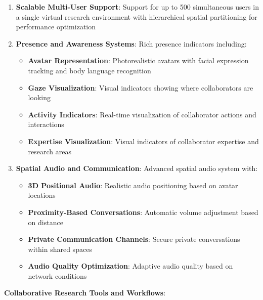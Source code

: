 \documentclass[10pt,twocolumn]{article}
\begin{document}
\begin{enumerate}
    \item \textbf{Scalable Multi-User Support}: Support for up to 500 simultaneous users in a single virtual research environment with hierarchical spatial partitioning for performance optimization
    
    \item \textbf{Presence and Awareness Systems}: Rich presence indicators including:
    \begin{itemize}
        \item \textbf{Avatar Representation}: Photorealistic avatars with facial expression tracking and body language recognition
        \item \textbf{Gaze Visualization}: Visual indicators showing where collaborators are looking
        \item \textbf{Activity Indicators}: Real-time visualization of collaborator actions and interactions
        \item \textbf{Expertise Visualization}: Visual indicators of collaborator expertise and research areas
    \end{itemize}
    
    \item \textbf{Spatial Audio and Communication}: Advanced spatial audio system with:
    \begin{itemize}
        \item \textbf{3D Positional Audio}: Realistic audio positioning based on avatar locations
        \item \textbf{Proximity-Based Conversations}: Automatic volume adjustment based on distance
        \item \textbf{Private Communication Channels}: Secure private conversations within shared spaces
        \item \textbf{Audio Quality Optimization}: Adaptive audio quality based on network conditions
    \end{itemize}
\end{enumerate}

\textbf{Collaborative Research Tools and Workflows}:
\end{document}
